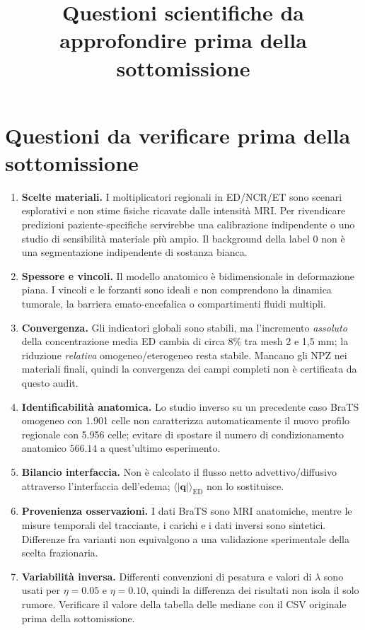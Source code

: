 \documentclass[11pt,a4paper]{article}
\title{Questioni scientifiche da approfondire prima della sottomissione}
\date{}
\begin{document}
\maketitle
\section*{Questioni da verificare prima della sottomissione}
\begin{enumerate}
\item \textbf{Scelte materiali.} I moltiplicatori regionali in ED/NCR/ET sono scenari esplorativi e non stime fisiche ricavate dalle intensit\`a MRI. Per rivendicare predizioni paziente-specifiche servirebbe una calibrazione indipendente o uno studio di sensibilit\`a materiale pi\`u ampio. Il background della label 0 non \`e una segmentazione indipendente di sostanza bianca.
\item \textbf{Spessore e vincoli.} Il modello anatomico \`e bidimensionale in deformazione piana. I vincoli e le forzanti sono ideali e non comprendono la dinamica tumorale, la barriera emato-encefalica o compartimenti fluidi multipli.
\item \textbf{Convergenza.} Gli indicatori globali sono stabili, ma l'incremento \emph{assoluto} della concentrazione media ED cambia di circa 8\% tra mesh 2 e 1,5 mm; la riduzione \emph{relativa} omogeneo/eterogeneo resta stabile. Mancano gli NPZ nei materiali finali, quindi la convergenza dei campi completi non \`e certificata da questo audit.
\item \textbf{Identificabilit\`a anatomica.} Lo studio inverso su un precedente caso BraTS omogeneo con 1.901 celle non caratterizza automaticamente il nuovo profilo regionale con 5.956 celle; evitare di spostare il numero di condizionamento anatomico $566.14$ a quest'ultimo esperimento.
\item \textbf{Bilancio interfaccia.} Non \`e calcolato il flusso netto advettivo/diffusivo attraverso l'interfaccia dell'edema; $\langle|\mathbf q|\rangle_{\mathrm{ED}}$ non lo sostituisce.
\item \textbf{Provenienza osservazioni.} I dati BraTS sono MRI anatomiche, mentre le misure temporali del tracciante, i carichi e i dati inversi sono sintetici. Differenze fra varianti non equivalgono a una validazione sperimentale della scelta frazionaria.
\item \textbf{Variabilit\`a inversa.} Differenti convenzioni di pesatura e valori di $\lambda$ sono usati per $\eta=0.05$ e $\eta=0.10$, quindi la differenza dei risultati non isola il solo rumore. Verificare il valore della tabella delle mediane con il CSV originale prima della sottomissione.

\end{enumerate}
\end{document}

